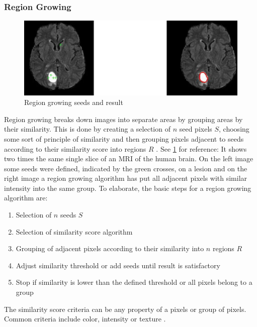 \subsubsection{Region Growing}
\begin{figure}[h]
	\centerline{\includegraphics[scale=0.5]{images/regionGrowing.png}}
	\caption{Region growing seeds and result \cite{pandyaExploringImageSegmentation2024}}\label{fig:rgSR}
\end{figure}
\noindent
Region growing breaks down images into separate areas by grouping areas by their similarity.
This is done by creating a selection of $n$ seed pixels $S$, choosing some sort of principle of similarity
and then grouping pixels adjacent to seeds according to their similarity score into regions $R$ \cite{jourlinVariousContrastConcepts2016,palReviewImageSegmentation1993}.
See \cref{fig:rgSR} for reference: It shows two times the same single slice of an MRI of the human brain.
On the left image some seeds were defined, indicated by the green crosses, on a lesion
and on the right image a region growing algorithm has put all adjacent pixels with similar intensity into the same group.
To elaborate, the basic steps for a region growing algorithm are:
\begin{enumerate}
	\item Selection of $n$ seeds $S$
	\item Selection of similarity score algorithm
	\item Grouping of adjacent pixels according to their similarity into $n$ regions $R$
	\item Adjust similarity threshold or add seeds until result is satisfactory
	\item Stop if similarity is lower than the defined threshold or all pixels belong to a group
\end{enumerate}
The similarity score criteria can be any property of a pixels or group of pixels.
Common criteria include color, intensity or texture \cite{jourlinVariousContrastConcepts2016,palReviewImageSegmentation1993}.
